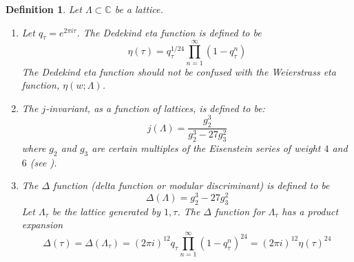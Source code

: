 \documentclass[12pt]{article}
\newtheorem{defn}{Definition}
\newcommand{\Complex}{\mathbb{C}}
\begin{document}
\begin{defn}
Let $\Lambda\subset\Complex$ be a lattice.
\begin{enumerate}
\item Let $q_{\tau}=e^{2\pi i \tau}$. The \emph{Dedekind eta
function} is defined to be
$$\eta(\tau)=q_{\tau}^{1/24}\prod_{n=1}^{\infty}(1-q_{\tau}^n)$$
The Dedekind eta function should not be confused with the
Weierstrass eta function, $\eta(w;\Lambda)$.

\item The $j$-invariant, as a function of lattices, is defined to
be:
$$j(\Lambda)=\frac{g_2^3}{g_2^3-27g_3^2}$$
where $g_2$ and $g_3$ are certain multiples of the Eisenstein
series of weight $4$ and $6$ (see ).

\item The \emph{$\Delta$ function} (\emph{delta function} or
\emph{modular discriminant}) is defined to be
$$\Delta(\Lambda)=g_2^3-27g_3^2$$
Let $\Lambda_{\tau}$ be the lattice generated by $1,\tau$. The $\Delta$ function for $\Lambda_{\tau}$ has a product expansion
$$\Delta(\tau)=\Delta(\Lambda_{\tau})=(2\pi
i)^{12}q_{\tau}\prod_{n=1}^{\infty}(1-q_{\tau}^n)^{24}=(2\pi
i)^{12}\eta(\tau)^{24}$$

\end{enumerate}
\end{defn}
\end{document}

